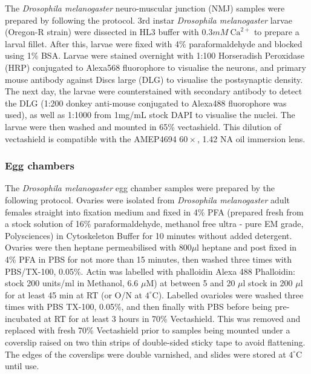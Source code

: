 The \textit{Drosophila melanogaster} neuro-muscular junction (NMJ) 
samples were prepared by following the protocol. 
3rd instar \textit{Drosophila melanogaster} larvae (Oregon-R 
strain) were dissected in HL3 buffer with $0.3mM~\text{Ca}^{2+}$ to 
prepare a larval fillet. After this, larvae were fixed with 
4\% paraformaldehyde and blocked using 1\% BSA.\cite{brent2009drosophila} Larvae were stained overnight with 1:100 Horseradish Peroxidase (HRP) 
conjugated to Alexa568 fluorophore to visualise the neurons, and 
primary mouse antibody against Discs large (DLG) to visualise the 
postsynaptic density. The next day, the larvae were counterstained 
with secondary antibody to detect the DLG (1:200 donkey anti-mouse 
conjugated to Alexa488 fluorophore was used), as well as 1:1000 from 1mg/mL 
stock DAPI to visualise the nuclei. The larvae were then washed and mounted 
in 65\% vectashield\cite{brent2009drosophila}. This dilution of 
vectashield is compatible with the AMEP4694 $60\times$, 1.42 NA oil 
immersion lens.

\subsubsection{Egg chambers}
\label{subsubsec:Aurox_Egg_chambers_prep}


The \textit{Drosophila melanogaster} egg chamber samples were prepared by the 
following protocol. Ovaries were isolated from \textit{Drosophila 
melanogaster} adult females straight into fixation medium and fixed in 4\% PFA 
(prepared fresh from a stock solution of 16\% paraformaldehyde, methanol free 
ultra - pure EM grade, Polysciences) in Cytoskeleton Buffer for 10 minutes 
without added 
detergent\cite{jia2016automatic,zhang2020nanoscale,leyton2016pfa}.  Ovaries 
were then heptane permeabilised with 800$\mu$l heptane and post fixed in 4\% 
PFA in PBS for not more than 15 minutes, then washed three times with 
PBS/TX-100, 0.05\%. Actin was labelled with phalloidin Alexa 488 Phalloidin: 
stock 200 units/ml in Methanol, 6.6 $\mu$M) at between 5 and 20 $\mu$l stock 
in 200 $\mu$l for at least 45 min at RT (or O/N at $4^{\circ}$C). Labelled 
ovarioles were washed three times with PBS TX-100, 0.05\%, and then finally 
with PBS before being pre-incubated at RT for at least 3 hours in 70\% 
Vectashield. This was removed and replaced with fresh 70\% Vectashield prior 
to samples being mounted under a coverslip raised on two thin strips of 
double-sided sticky tape to avoid flattening\cite{davidson2016localized}. The 
edges of the coverslips were double varnished, and slides were stored at 
$4^{\circ}$C until use.

